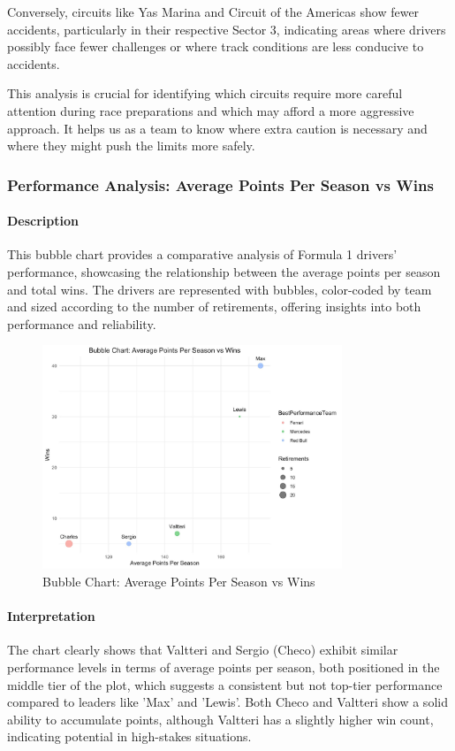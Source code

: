\documentclass{article}
\begin{document}
Conversely, circuits like Yas Marina and Circuit of the Americas show fewer accidents, particularly in their respective Sector 3, indicating areas where drivers possibly face fewer challenges or where track conditions are less conducive to accidents. 

This analysis is crucial for identifying which circuits require more careful attention during race preparations and which may afford a more aggressive approach. It helps us as a team to know where extra caution is necessary and where they might push the limits more safely.

\subsubsection{Performance Analysis: Average Points Per Season vs Wins}

\paragraph{Description}
This bubble chart provides a comparative analysis of Formula 1 drivers' performance, showcasing the relationship between the average points per season and total wins. The drivers are represented with bubbles, color-coded by team and sized according to the number of retirements, offering insights into both performance and reliability.

\begin{figure}[H]
    \centering
    \includegraphics[width=0.8\textwidth]{images/querie/newDriver.jpeg}
    \caption{Bubble Chart: Average Points Per Season vs Wins}
\end{figure}

\paragraph{Interpretation}
The chart clearly shows that Valtteri and Sergio (Checo) exhibit similar performance levels in terms of average points per season, both positioned in the middle tier of the plot, which suggests a consistent but not top-tier performance compared to leaders like 'Max' and 'Lewis'. Both Checo and Valtteri show a solid ability to accumulate points, although Valtteri has a slightly higher win count, indicating potential in high-stakes situations.
\end{document}
